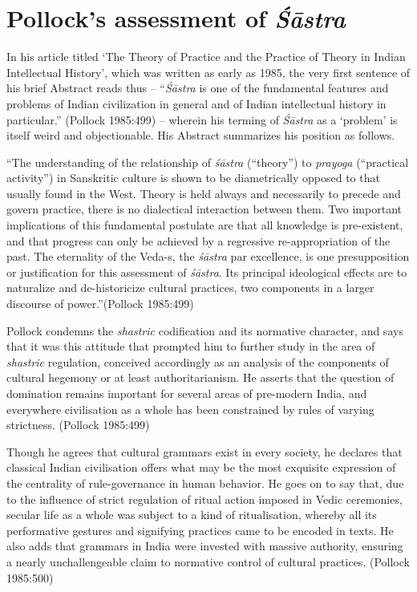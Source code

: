 \vskip -12pt

\section*{Pollock's assessment of {\sl\bfseries Śāstra}}

In his article titled `The Theory of Practice and the Practice of Theory in Indian Intellectual History', which was written as early as 1985, the very first sentence of his brief Abstract reads thus -- ``{\it Śāstra} is one of the fundamental features and problems of Indian civilization in general and of Indian intellectual history in particular.'' (Pollock 1985:499) -- wherein his terming of {\it Śāstra} as a `problem'  is itself weird and objectionable. His Abstract summarizes his position as follows.
\begin{myquote}
``The understanding of the relationship of {\sl śāstra} (``theory'') to {\sl prayoga}  (``practical activity'') in Sanskritic culture is shown to be diametrically opposed to that usually found in the West. Theory is held always and necessarily to precede and govern practice, there is no dialectical interaction between them. Two important implications of this fundamental postulate are that all knowledge is pre-existent, and that progress can only be achieved by a regressive re-appropriation of the past. The eternality of the Veda-s, the {\sl śāstra} par excellence, is one presupposition or justification for this assessment of {\sl śāstra}. Its principal ideological effects are to naturalize and de-historicize cultural practices, two components in a larger discourse of power.''\hfill (Pollock 1985:499)
\end{myquote}

Pollock condemns the {\sl shastric} codification and its normative character, and says that it was this attitude that prompted him to further study in the area of {\sl shastric} regulation, conceived accordingly as an analysis of the components of cultural hegemony or at least authoritarianism. He asserts that the question of domination remains important for several areas of pre-modern India, and everywhere civilisation as a whole has been constrained by rules of varying strictness. (Pollock 1985:499)

Though he agrees that cultural grammars exist in every society, he declares that classical Indian civilisation offers what may be the most exquisite expression of the centrality of rule-governance in human behavior. He goes on to say that, due to the influence of strict regulation of ritual action imposed in Vedic ceremonies, secular life as a whole was subject to a kind of ritualisation, whereby all its performative gestures and signifying practices came to be encoded in texts. He also adds that grammars in India were invested with massive authority, ensuring a nearly unchallengeable claim to normative control of cultural practices. (Pollock 1985:500)

